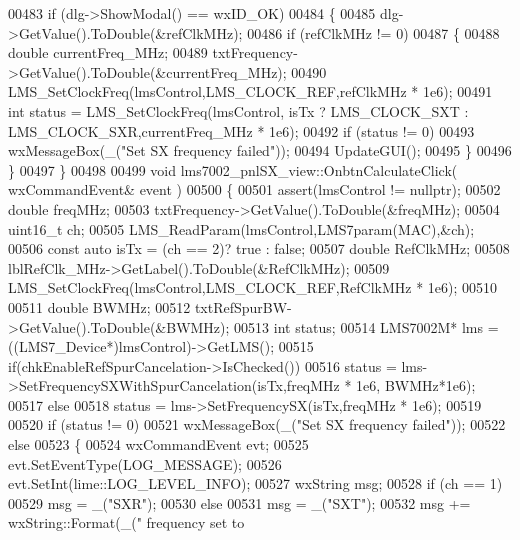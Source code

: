 \begin{DoxyCode}
{{{{{{{{{{{{{{{{{{{{{{{{{{{{{{{{{{{{{{{{{{{{{{{{{{{{{{{{{{{{{{{{{{{{{{{{{{{{{{{{{{{{{{{{{{{{{{{{{{{{{{{{{{{{{{{{{{{{{{{{{{{{{{{{{{{{{{{{{{{{{{{{{{{{{{{{{{{{{{{{{{{{{{{{{{{{{{{{{{{{{{{{{{{{{{{{{{{{{{{{{{{{{{{{{{{{{{{{{{{{{{{{{{{{{{{{{{{{{{{{{{{{{{{{{{{{{{{{{{{{{{{{{00483     \textcolor{keywordflow}{if} (dlg->ShowModal() == wxID\_OK)
00484     \{
00485         dlg->GetValue().ToDouble(&refClkMHz);
00486         \textcolor{keywordflow}{if} (refClkMHz != 0)
00487         \{
00488             \textcolor{keywordtype}{double} currentFreq\_MHz;
00489             txtFrequency->GetValue().ToDouble(&currentFreq\_MHz);
00490             LMS_SetClockFreq(lmsControl,LMS_CLOCK_REF,refClkMHz * 1e6);
00491             \textcolor{keywordtype}{int} status = LMS_SetClockFreq(lmsControl, isTx ? LMS_CLOCK_SXT : 
      LMS_CLOCK_SXR,currentFreq\_MHz * 1e6);
00492             \textcolor{keywordflow}{if} (status != 0)
00493                 wxMessageBox(\_(\textcolor{stringliteral}{"Set SX frequency failed"}));
00494             UpdateGUI();
00495         \}
00496     \}
00497 \}
00498 
00499 \textcolor{keywordtype}{void} lms7002_pnlSX_view::OnbtnCalculateClick( wxCommandEvent& event )
00500 \{
00501     assert(lmsControl != \textcolor{keyword}{nullptr});
00502     \textcolor{keywordtype}{double} freqMHz;
00503     txtFrequency->GetValue().ToDouble(&freqMHz);
00504     uint16\_t ch;
00505     LMS_ReadParam(lmsControl,LMS7param(MAC),&ch);
00506     \textcolor{keyword}{const} \textcolor{keyword}{auto} isTx = (ch == 2)? \textcolor{keyword}{true} : \textcolor{keyword}{false};
00507     \textcolor{keywordtype}{double} RefClkMHz;
00508     lblRefClk_MHz->GetLabel().ToDouble(&RefClkMHz);
00509     LMS_SetClockFreq(lmsControl,LMS_CLOCK_REF,RefClkMHz * 1e6);
00510 
00511     \textcolor{keywordtype}{double} BWMHz;
00512     txtRefSpurBW->GetValue().ToDouble(&BWMHz);
00513     \textcolor{keywordtype}{int} status;
00514     LMS7002M* lms = ((LMS7_Device*)lmsControl)->GetLMS();
00515     \textcolor{keywordflow}{if}(chkEnableRefSpurCancelation->IsChecked())
00516         status = lms->SetFrequencySXWithSpurCancelation(isTx,freqMHz * 1e6, BWMHz*1e6);
00517     \textcolor{keywordflow}{else}
00518         status = lms->SetFrequencySX(isTx,freqMHz * 1e6);
00519 
00520     \textcolor{keywordflow}{if} (status != 0)
00521         wxMessageBox(\_(\textcolor{stringliteral}{"Set SX frequency failed"}));
00522     \textcolor{keywordflow}{else}
00523     \{
00524         wxCommandEvent evt;
00525         evt.SetEventType(LOG\_MESSAGE);
00526         evt.SetInt(lime::LOG_LEVEL_INFO);
00527         wxString msg;
00528         \textcolor{keywordflow}{if} (ch == 1)
00529             msg = \_(\textcolor{stringliteral}{"SXR"});
00530         \textcolor{keywordflow}{else}
00531             msg = \_(\textcolor{stringliteral}{"SXT"});
00532         msg += wxString::Format(\_(\textcolor{stringliteral}{" frequency set to %
}}}}}}}}}}}}}}}}}}}}}}}}}}}}}}}}}}}}}}}}}}}}}}}}}}}}}}}}}}}}}}}}}}}}}}}}}}}}}}}}}}}}}}}}}}}}}}}}}}}}}}}}}}}}}}}}}}}}}}}}}}}}}}}}}}}}}}}}}}}}}}}}}}}}}}}}}}}}}}}}}}}}}}}}}}}}}}}}}}}}}}}}}}}}}}}}}}}}}}}}}}}}}}}}}}}}}}}}}}}}}}}}}}}}}}}}}}}}}}}}}}}}}}}}}}}}}}}}}}}}}}}}}}
\end{DoxyCode}

